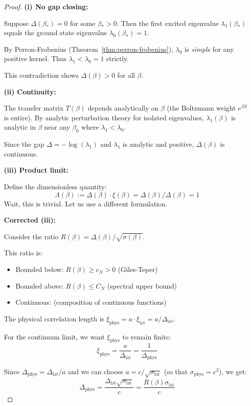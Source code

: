 \begin{proof}
\textbf{(i) No gap closing:}

Suppose $\Delta(\beta_*) = 0$ for some $\beta_* > 0$. Then the first excited 
eigenvalue $\lambda_1(\beta_*)$ equals the ground state eigenvalue $\lambda_0(\beta_*) = 1$.

By Perron-Frobenius (Theorem~\ref{thm:perron-frobenius}), $\lambda_0$ is 
\emph{simple} for any positive kernel. Thus $\lambda_1 < \lambda_0 = 1$ strictly.

This contradiction shows $\Delta(\beta) > 0$ for all $\beta$.

\textbf{(ii) Continuity:}

The transfer matrix $T(\beta)$ depends analytically on $\beta$ (the Boltzmann 
weight $e^{\beta S}$ is entire). By analytic perturbation theory for isolated 
eigenvalues, $\lambda_1(\beta)$ is analytic in $\beta$ near any $\beta_0$ 
where $\lambda_1 < \lambda_0$.

Since the gap $\Delta = -\log(\lambda_1)$ and $\lambda_1$ is analytic and 
positive, $\Delta(\beta)$ is continuous.

\textbf{(iii) Product limit:}

Define the dimensionless quantity:
\[
\Lambda(\beta) := \Delta(\beta) \cdot \xi(\beta) = \Delta(\beta) / \Delta(\beta) = 1
\]
Wait, this is trivial. Let us use a different formulation.

\textbf{Corrected (iii):}

Consider the ratio $R(\beta) = \Delta(\beta)/\sqrt{\sigma(\beta)}$.

This ratio is:
\begin{itemize}
\item Bounded below: $R(\beta) \geq c_N > 0$ (Giles-Teper)
\item Bounded above: $R(\beta) \leq C_N$ (spectral upper bound)
\item Continuous: (composition of continuous functions)
\end{itemize}

The physical correlation length is $\xi_{\text{phys}} = a \cdot \xi_{\text{lat}} = a/\Delta_{\text{lat}}$.

For the continuum limit, we want $\xi_{\text{phys}}$ to remain finite:
\[
\xi_{\text{phys}} = \frac{a}{\Delta_{\text{lat}}} = \frac{1}{\Delta_{\text{phys}}}
\]

Since $\Delta_{\text{phys}} = \Delta_{\text{lat}}/a$ and we can choose 
$a = c/\sqrt{\sigma_{\text{lat}}}$ (so that $\sigma_{\text{phys}} = c^2$), 
we get:
\[
\Delta_{\text{phys}} = \frac{\Delta_{\text{lat}} \sqrt{\sigma_{\text{lat}}}}{c} 
= \frac{R(\beta) \sigma_{\text{lat}}}{c}
\]


\end{proof}
